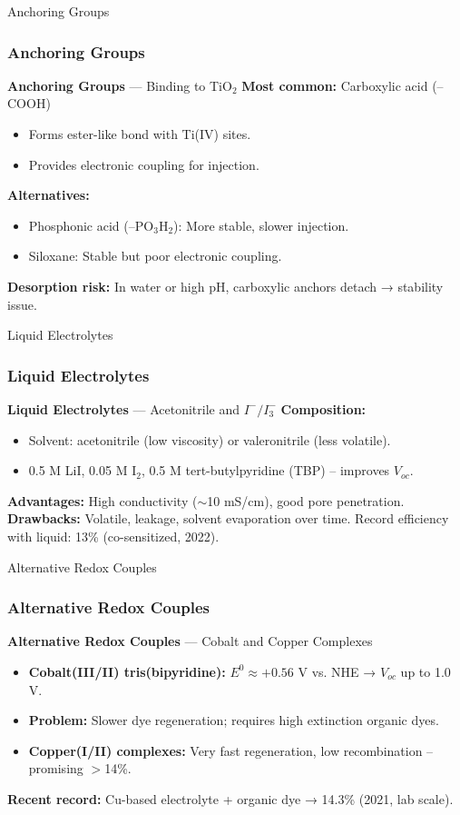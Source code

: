 \documentclass[aspectratio=169]{beamer}
\begin{document}
\begin{frame}{Anchoring Groups}
\frametitle{Anchoring Groups}

\textbf{Anchoring Groups} — Binding to TiO$_2$
\textbf{Most common:} Carboxylic acid (–COOH)
\begin{itemize}
\item Forms ester-like bond with Ti(IV) sites.
\item Provides electronic coupling for injection.
\end{itemize}
\textbf{Alternatives:}
\begin{itemize}
\item Phosphonic acid (–PO$_3$H$_2$): More stable, slower injection.
\item Siloxane: Stable but poor electronic coupling.
\end{itemize}
\textbf{Desorption risk:} In water or high pH, carboxylic anchors detach → stability issue.
\cite{Galoppini2004}
\end{frame}


\begin{frame}{Liquid Electrolytes}
\frametitle{Liquid Electrolytes}

\textbf{Liquid Electrolytes} — Acetonitrile and $I^-/I_3^-$
\textbf{Composition:}
\begin{itemize}
\item Solvent: acetonitrile (low viscosity) or valeronitrile (less volatile).
\item 0.5 M LiI, 0.05 M I$_2$, 0.5 M tert-butylpyridine (TBP) – improves $V_{oc}$.
\end{itemize}
\textbf{Advantages:} High conductivity ($\sim$10 mS/cm), good pore penetration.
\textbf{Drawbacks:} Volatile, leakage, solvent evaporation over time.
\vspace{2mm}
Record efficiency with liquid: 13\% (co-sensitized, 2022).
\cite{Yella2011}
\end{frame}


\begin{frame}{Alternative Redox Couples}
\frametitle{Alternative Redox Couples}

\textbf{Alternative Redox Couples} — Cobalt and Copper Complexes
\begin{itemize}
\item \textbf{Cobalt(III/II) tris(bipyridine):} $E^0 \approx +0.56$ V vs. NHE → $V_{oc}$ up to 1.0 V.
\item \textbf{Problem:} Slower dye regeneration; requires high extinction organic dyes.
\item \textbf{Copper(I/II) complexes:} Very fast regeneration, low recombination – promising $>$14\%.
\end{itemize}
\textbf{Recent record:} Cu-based electrolyte + organic dye → 14.3\% (2021, lab scale).
\cite{Saygili2018}
\end{frame}
\end{document}
